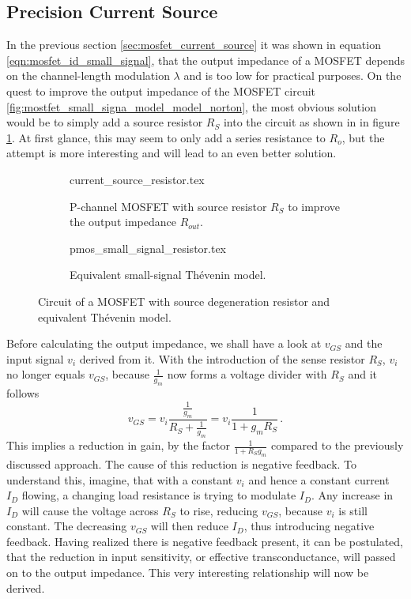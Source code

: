 \clearpage
\subsection{Precision Current Source}
\label{sec:precision_current_source}
In the previous section \ref{sec:mosfet_current_source} it was shown in equation \ref{eqn:mosfet_id_small_signal}, that the output impedance of a MOSFET depends on the channel-length modulation $\lambda$ and is too low for practical purposes. On the quest to improve the output impedance of the MOSFET circuit \ref{fig:mostfet_small_signa_model_model_norton}, the most obvious solution would be to simply add a source resistor $R_S$ into the circuit as shown in in figure \ref{fig:pmos_current_source_resistor}. At first glance, this may seem to only add a series resistance to $R_o$, but the attempt is more interesting and will lead to an even better solution.

\begin{figure}[ht]
    \centering
    \begin{subfigure}[t]{0.45\linewidth}
        \centering
        {current_source_resistor.tex}
        \caption{P-channel MOSFET with source resistor $R_S$ to improve the output impedance $R_{out}$.}
        \label{fig:pmos_current_source_resistor}
    \end{subfigure}%
    \begin{subfigure}[t]{0.45\linewidth}
         \centering
         {pmos_small_signal_resistor.tex}
         \caption{Equivalent small-signal Thévenin model.}
         \label{fig:pmos_current_source_resistor_small_signal}
     \end{subfigure}%
     \caption{Circuit of a MOSFET with source degeneration resistor and equivalent Thévenin model.}
\end{figure}

Before calculating the output impedance, we shall have a look at $v_{GS}$ and the input signal $v_i$ derived from it. With the introduction of the sense resistor $R_S$, $v_i$ no longer equals $v_{GS}$, because $\frac{1}{g_m}$ now forms a voltage divider with $R_S$ and it follows
\begin{equation}
    v_{GS} = v_i \frac{\frac{1}{g_m}}{R_S + \frac{1}{g_m}} = v_i \frac{1}{1 + g_m R_S} \,.
\end{equation}
This implies a reduction in gain, by the factor $\frac{1}{1 + R_S g_m}$ compared to the previously discussed approach. The cause of this reduction is negative feedback. To understand this, imagine, that with a constant $v_i$ and hence a constant current $I_D$ flowing, a changing load resistance is trying to modulate $I_D$. Any increase in $I_D$ will cause the voltage across $R_S$ to rise, reducing $v_{GS}$, because $v_i$ is still constant. The decreasing $v_{GS}$ will then reduce $I_D$, thus introducing negative feedback. Having realized there is negative feedback present, it can be postulated, that the reduction in input sensitivity, or effective transconductance, will passed on to the output impedance. This very interesting relationship will now be derived.

